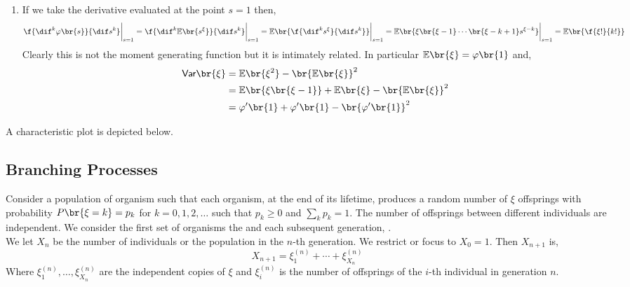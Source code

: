\documentclass{article}
\newcommand{\Var}{\textsf{Var}}
\newcommand{\Exp}{\mathbb{E}}
\begin{document}
\begin{enumerate}
\begin{proof}
\begin{align*}
                &= \varphi_1\br{s}\cdots\varphi_n\br{s}
            \end{align*}
        \end{proof}
        \item If we take the derivative evaluated at the point $s = 1$ then,
        \[ \f{\dif^k \varphi\br{s}}{\dif s^k} \bigg|_{s=1} = \f{\dif^k \Exp\br{s^{\xi}}}{\dif s^k} \bigg|_{s=1} = \Exp\br{ \f{\dif^k s^{\xi}}{\dif s^k}} \bigg|_{s=1} = \Exp\br{\xi\br{\xi-1}\cdots\br{\xi - k + 1}s^{\xi - k}}\bigg|_{s=1} = \Exp\br{\f{\xi!}{k!}} \]
        Clearly this is not the moment generating function but it is intimately related. In particular $\Exp\br{\xi} = \varphi\br{1}$ and,
        \begin{align*}
        \Var\br{\xi}
        &= \Exp\br{\xi^2} - \br{\Exp\br{\xi}}^2 \\
        &= \Exp\br{\xi\br{\xi - 1}} + \Exp\br{\xi} - \br{\Exp\br{\xi}}^2 \\
        &= \varphi'\br{1} + \varphi'\br{1} - \br{\varphi'\br{1}}^2
        \end{align*}
    \end{enumerate}
    A characteristic plot is depicted below.
    \begin{center}
    \end{center}

    \subsection{Branching Processes}
    Consider a population of organism such that each organism, at the end of its lifetime, produces a random number of $\xi$ offsprings with probability $P\br{\xi = k} = p_k$ for $k = 0, 1, 2, \ldots$ such that $p_k \geq 0$ and $\sum_k p_k = 1$. The number of offsprings between different individuals are independent. We consider the first set of organisms the  and each subsequent generation, . \\

    We let $X_n$ be the number of individuals or the population in the $n$-th generation. We restrict or focus to $X_0 = 1$. Then $X_{n+1}$ is,
    \[ X_{n+1} = \xi^{(n)}_1 + \cdots + \xi^{(n)}_{X_n} \]
    Where $\xi^{(n)}_1, \ldots, \xi^{(n)}_{X_n}$ are the independent copies of $\xi$ and $\xi_{i}^{(n)}$ is the number of offsprings of the $i$-th individual in generation $n$. \\
\end{document}
